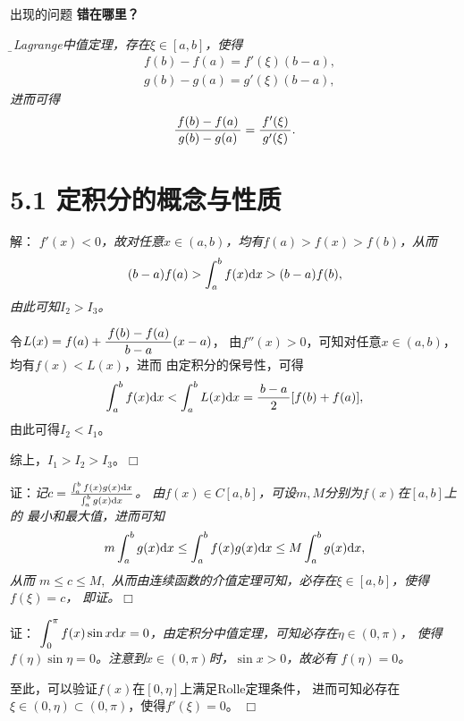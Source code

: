 \begin{frame}{出现的问题}
	\linespread{1.5}
	{\bf 错在哪里？}
	
	\it\b
	由Lagrange中值定理，存在$\xi\in[a,b]$，使得
	\begin{align*}
		&f(b)-f(a)=f'(\xi)(b-a),\\
		&g(b)-g(a)=g'(\xi)(b-a),
	\end{align*}
	进而可得
	$$\displaystyle\frac{\,{f(b)-f(a)}\,}{\,{g(b)-g(a)}\,}=\displaystyle\frac{\,{f'(\xi)}\,}{\,{g'(\xi)}\,}.$$
\end{frame}

\section{5.1 定积分的概念与性质}

\begin{frame}
	\linespread{1.5}
	\pause
	
	
	\small 解：\it
	$f'(x)<0$，故对任意$x\in(a,b)$，均有$f(a)>f(x)>f(b)$，从而
	$$(b-a)f(a)>\displaystyle\int_a^bf(x)\mathrm{d} x>(b-a)f(b),$$
	由此可知$I_2>I_3$。
	\pause
	
	令$L(x)=f(a)+\displaystyle\frac{\,{f(b)-f(a)}\,}{\,{b-a}\,}(x-a)$，
	由$f''(x)>0$，可知对任意$x\in(a,b)$，均有$f(x)<L(x)$，进而
	由定积分的保号性，可得
	$$\displaystyle\int_a^bf(x)\mathrm{d} x<\displaystyle\int_a^bL(x)\mathrm{d} x=\displaystyle\frac{\,{b-a}\,}{\,{2}\,}[f(b)+f(a)],$$
	由此可得$I_2<I_1$。
	
	综上，$I_1>I_2>I_3$。\hfill$\Box$
\end{frame}

\begin{frame}
	\linespread{1.5}
	\pause
	
	
	\small 证：\it 记$c=\frac{\int_a^bf(x)g(x)\mathrm{d} x}{\int_a^bg(x)\mathrm{d} x}$。
	由$f(x)\in C[a,b]$，可设$m,M$分别为$f(x)$在$[a,b]$上的
	最小和最大值，进而可知
	$$m\displaystyle\int_a^bg(x)\mathrm{d} x\leq \displaystyle\int_a^bf(x)g(x)\mathrm{d} x\leq M\displaystyle\int_a^bg(x)\mathrm{d} x,$$
	从而	$m\leq c\leq M,$
	从而由连续函数的介值定理可知，必存在$\xi\in[a,b]$，使得
	$f(\xi)=c$，
	即证。\hfill$\Box$
\end{frame}

\begin{frame}
	\linespread{1.5}
	\pause
	
	\bigskip
	
	\small 证：\it 
	$\displaystyle\int_0^{\pi}f(x)\sin x\mathrm{d} x=0$，由定积分中值定理，可知必存在$\eta\in(0,\pi)$，
	使得$f(\eta)\sin\eta=0$。注意到$x\in(0,\pi)$时，$\sin x>0$，故必有
	$f(\eta)=0$。\pause
	
	至此，可以验证$f(x)$在$[0,\eta]$上满足Rolle定理条件，
	进而可知必存在$\xi\in(0,\eta)\subset (0,\pi)$，使得$f'(\xi)=0$。
	\hfill$\Box$
\end{frame}

